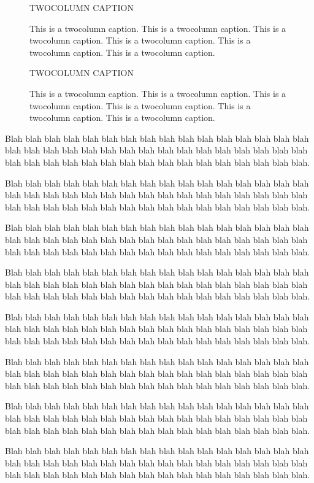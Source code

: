 \documentclass[a4paper]{article}
\newcommand*\longcaption[1]{This is a #1 caption. This is a #1 caption. This is a #1 caption.
  This is a #1 caption. This is a #1 caption. This is a #1 caption.}
\newcommand*\test[3]{%
  \begin{figure}[!ht]
  \centerline{\uppercase{#1 caption}}
  \caption[This figure sucks]{\label{#2}#3{#1}}
  \end{figure}}
\begin{document}
\test{twocolumn}{twocolumn1}{\longcaption}
\begin{figure}[!ht]
 \centerline{\uppercase{twocolumn caption}}
 \setcaptionmargin{1mm}%
 \caption{\label{twocolumn2}\longcaption{twocolumn}}
\end{figure}

Blah blah blah blah blah blah blah blah blah blah blah blah blah blah blah blah
blah blah blah blah blah blah blah blah blah blah blah blah blah blah blah blah
blah blah blah blah blah blah blah blah blah blah blah blah blah blah blah blah.

Blah blah blah blah blah blah blah blah blah blah blah blah blah blah blah blah
blah blah blah blah blah blah blah blah blah blah blah blah blah blah blah blah
blah blah blah blah blah blah blah blah blah blah blah blah blah blah blah blah.

Blah blah blah blah blah blah blah blah blah blah blah blah blah blah blah blah
blah blah blah blah blah blah blah blah blah blah blah blah blah blah blah blah
blah blah blah blah blah blah blah blah blah blah blah blah blah blah blah blah.

Blah blah blah blah blah blah blah blah blah blah blah blah blah blah blah blah
blah blah blah blah blah blah blah blah blah blah blah blah blah blah blah blah
blah blah blah blah blah blah blah blah blah blah blah blah blah blah blah blah.

Blah blah blah blah blah blah blah blah blah blah blah blah blah blah blah blah
blah blah blah blah blah blah blah blah blah blah blah blah blah blah blah blah
blah blah blah blah blah blah blah blah blah blah blah blah blah blah blah blah.

Blah blah blah blah blah blah blah blah blah blah blah blah blah blah blah blah
blah blah blah blah blah blah blah blah blah blah blah blah blah blah blah blah
blah blah blah blah blah blah blah blah blah blah blah blah blah blah blah blah.

Blah blah blah blah blah blah blah blah blah blah blah blah blah blah blah blah
blah blah blah blah blah blah blah blah blah blah blah blah blah blah blah blah
blah blah blah blah blah blah blah blah blah blah blah blah blah blah blah blah.

Blah blah blah blah blah blah blah blah blah blah blah blah blah blah blah blah
blah blah blah blah blah blah blah blah blah blah blah blah blah blah blah blah
blah blah blah blah blah blah blah blah blah blah blah blah blah blah blah blah.
\end{document}
